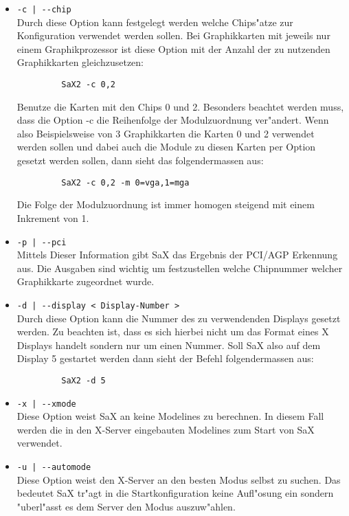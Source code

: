 \begin{itemize}
\item \verb+-c | --chip+\\
      Durch diese Option kann festgelegt werden welche Chips"atze 
      zur Konfiguration verwendet werden sollen. Bei Graphikkarten 
      mit jeweils nur einem Graphikprozessor ist diese Option 
      mit der Anzahl der zu nutzenden Graphikkarten gleichzusetzen:
      \begin{verbatim}
         SaX2 -c 0,2
      \end{verbatim}
      Benutze die Karten mit den Chips 0 und 2. Besonders beachtet 
      werden muss, dass die Option -c die Reihenfolge der Modulzuordnung
      ver"andert. Wenn also Beispielsweise von 3 Graphikkarten die 
      Karten 0 und 2 verwendet werden sollen und dabei auch die Module
      zu diesen Karten per Option gesetzt werden sollen, dann sieht das
      folgendermassen aus:
      \begin{verbatim} 
         SaX2 -c 0,2 -m 0=vga,1=mga
      \end{verbatim}
      Die Folge der Modulzuordnung ist immer homogen steigend
      mit einem Inkrement von 1.

\item \verb+-p | --pci+\\
      Mittels Dieser Information gibt SaX das Ergebnis der PCI/AGP
      Erkennung aus. Die Ausgaben sind wichtig um festzustellen 
      welche Chipnummer welcher Graphikkarte zugeordnet wurde.

\item \verb+-d | --display < Display-Number >+\\
      Durch diese Option kann die Nummer des zu verwendenden
      Displays gesetzt werden. Zu beachten ist, dass es sich 
      hierbei nicht um das Format eines X Displays handelt sondern 
      nur um einen Nummer. Soll SaX also auf dem Display 5 gestartet
      werden dann sieht der Befehl folgendermassen aus:
      \begin{verbatim} 
         SaX2 -d 5
      \end{verbatim} 
      
\item \verb+-x | --xmode+\\
      Diese Option weist SaX an keine Modelines zu berechnen. In 
      diesem Fall werden die in den X-Server eingebauten 
      Modelines zum Start von SaX verwendet.

\item \verb+-u | --automode+\\
      Diese Option weist den X-Server an den besten Modus
      selbst zu suchen. Das bedeutet SaX tr"agt in die Startkonfiguration 
      keine Aufl"osung ein sondern "uberl"asst es dem Server den 
      Modus auszuw"ahlen.


\end{itemize}
